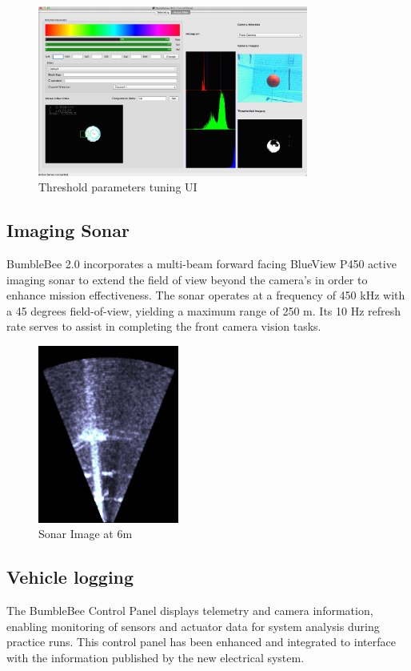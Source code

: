\documentclass[journal,12pt]{IEEEtran}
\begin{document}
\begin{figure}[h]
\centering
\includegraphics[width=3.5in]{controlpanel.png}
\caption{Threshold parameters tuning UI}
\end{figure}

\subsection{Imaging Sonar}
BumbleBee 2.0 incorporates a multi-beam forward facing BlueView P450 active imaging sonar to extend the field of view beyond the camera's in order to enhance mission effectiveness. The sonar operates at a frequency of 450 kHz with a 45 degrees field-of-view, yielding a maximum range of 250 m. Its 10 Hz refresh rate serves to assist in completing the front camera vision tasks.

\begin{figure}[h]
\centering
\includegraphics[height=2.3in]{sonarimage.png}
\caption{Sonar Image at 6m}
\captionsetup{justification=centering}
\end{figure}

\subsection{Vehicle logging}
The BumbleBee Control Panel displays telemetry and camera information, enabling monitoring of sensors and actuator data for system analysis during practice runs. This control panel has been enhanced and integrated to interface with the information published by the new electrical system. 
\end{document}
